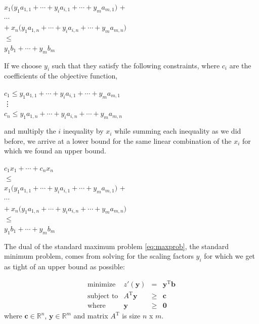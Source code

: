 \documentclass[12pt]{article}
\begin{document}
\begin{center}
    $x_1 \big(y_1a_{1,1} +  \cdots + y_ia_{i,1} + \cdots +  y_ma_{m,1}\big)$ + \\
    $\cdots$ \\
    $+ \ x_n\big(y_1a_{1,n} + \cdots + y_ia_{i,n} + \cdots +  y_ma_{m,n} \big) $\\
    $ \leq$ \\
    $ y_1b_1  + \cdots +  y_mb_m$ 
\end{center} 

If we choose $y_i$ such that they satisfy the following constraints, where $c_i$ are the coefficients of the objective function,

\begin{center}
	$c_1 \leq y_1a_{1,1} +  \cdots + y_ia_{i,1} + \cdots +  y_ma_{m,1}$ \\
\hspace{0cm} \vdots \\
	$c_n \leq y_1a_{1,n} +  \cdots + y_ia_{i,n} + \cdots +  y_ma_{m,n}$ \\
\end{center}

and multiply the $i$ inequality by $x_i$ while summing each inequality as we did before, we arrive at a lower bound for the same linear combination of the $x_i$ for which we found an upper bound.

\begin{center}
	$ c_1x_1 + \cdots + c_nx_n  $ \\
	$ \leq $\\
    $x_1 \big(y_1a_{1,1} +  \cdots + y_ia_{i,1} + \cdots +  y_ma_{m,1}\big)$ + \\
    $\cdots$ \\
    $+ \ x_n\big(y_1a_{1,n} + \cdots + y_ia_{i,n} + \cdots +  y_ma_{m,n} \big) $\\
    $ \leq$ \\
    $ y_1b_1  + \cdots +  y_mb_m$ 
\end{center} 

The dual of the standard maximum problem \eqref{eq:maxprob}, the standard minimum problem, comes from solving for the scaling factors $y_i$ for which we get as tight of an upper bound as possible:

\begin{equation} \label{eq:minprob}
    \begin{array}{rrcl}
        \text{minimize} & z'(\mathbf{y}) & = & \mathbf{y}^\text{T} \mathbf{b} \\
        \text{subject\ to} & A^\text{T} \mathbf{y} & \geq & \mathbf{c} \\
        \text{where} & \mathbf{y} & \geq & \mathbf{0}
    \end{array}
\end{equation}
where $\mathbf{c} \in \mathbb{R}^n$, $\mathbf{y} \in \mathbb{R}^m$ and matrix $A^\text{T}$ is size $n$ x $m$.
\end{document}

